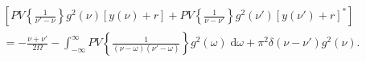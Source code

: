 \begin{equation}
\begin{split}
&\left[PV\left\{\frac{1}{\nu' - \nu}\right\}g^2(\nu)[y(\nu) + r] + PV\left\{\frac{1}{\nu - \nu'}\right\}g^2(\nu')[y(\nu') + r]^*\right]\\
&= -\frac{\nu + \nu'}{2\Omega} - \int_{-\infty}^\infty PV\left\{\frac{1}{(\nu - \omega)(\nu' - \omega)}\right\}g^2(\omega)\;\mathrm{d}\omega + \pi^2\delta(\nu - \nu')g^2(\nu).
\end{split}
\end{equation}
